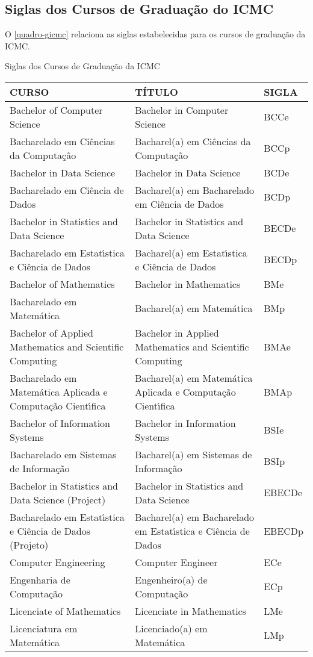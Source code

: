 \begin{apendicesenv}
\chapter{Siglas dos Cursos de Gradua\c{c}\~ao do ICMC}
O \autoref{quadro-gicmc} relaciona as siglas estabelecidas para os cursos de gradua\c{c}\~ao da ICMC.
\begin{quadro}[htb]
	\ABNTEXfontereduzida
	\caption[Siglas dos Cursos de Gradua\c{c}\~ao da ICMC]{Siglas dos Cursos de Gradua\c{c}\~ao da ICMC}
	\label{quadro-gicmc}
	\begin{tabular}{|p{6.5cm}|p{6.5cm}|p{1.75cm}|}
		\hline
		\textbf{CURSO} & \textbf{T\'ITULO} &  \textbf{SIGLA}  \\
		\hline
		Bachelor of Computer Science & Bachelor in Computer Science & BCCe\\
		Bacharelado em Ci\^encias da Computa\c{c}\~ao & Bacharel(a) em Ci\^encias da Computa\c{c}\~ao & BCCp\\
		Bachelor in Data Science & Bachelor in Data Science & BCDe\\
		Bacharelado em Ci\^encia de Dados & Bacharel(a) em Bacharelado em Ci\^encia de Dados & BCDp\\
		Bachelor in Statistics and Data Science & Bachelor in Statistics and Data Science & BECDe\\
		Bacharelado em Estat\'{\i}stica e Ci\^encia de Dados & Bacharel(a) em Estat\'{\i}stica e Ci\^encia de Dados & BECDp\\
		Bachelor of Mathematics & Bachelor in Mathematics & BMe\\
		Bacharelado em Matem\'atica & Bacharel(a) em Matem\'atica & BMp\\
		Bachelor of Applied Mathematics and Scientific Computing & Bachelor in Applied Mathematics and Scientific Computing & BMAe\\
		Bacharelado em Matem\'atica Aplicada e Computa\c{c}\~ao Cient\'{\i}fica & Bacharel(a) em Matem\'atica Aplicada e Computa\c{c}\~ao Cient\'{\i}fica & BMAp\\
		Bachelor of Information Systems & Bachelor in Information Systems & BSIe\\
		Bacharelado em Sistemas de Informa\c{c}\~ao & Bacharel(a) em Sistemas de Informa\c{c}\~ao & BSIp\\
		Bachelor in Statistics and Data Science (Project) & Bachelor in Statistics and Data Science & EBECDe\\
		Bacharelado em Estat\'{\i}stica e Ci\^encia de Dados (Projeto) & Bacharel(a) em Bacharelado em Estat\'{\i}stica e Ci\^encia de Dados & EBECDp\\
		Computer Engineering & Computer Engineer & ECe\\
		Engenharia de Computa\c{c}\~ao & Engenheiro(a) de Computa\c{c}\~ao & ECp\\
		Licenciate of  Mathematics & Licenciate in Mathematics & LMe\\
		Licenciatura em Matem\'atica & Licenciado(a) em Matem\'atica & LMp\\
	    \hline
		

\end{tabular}
\end{quadro}
\end{apendicesenv}
